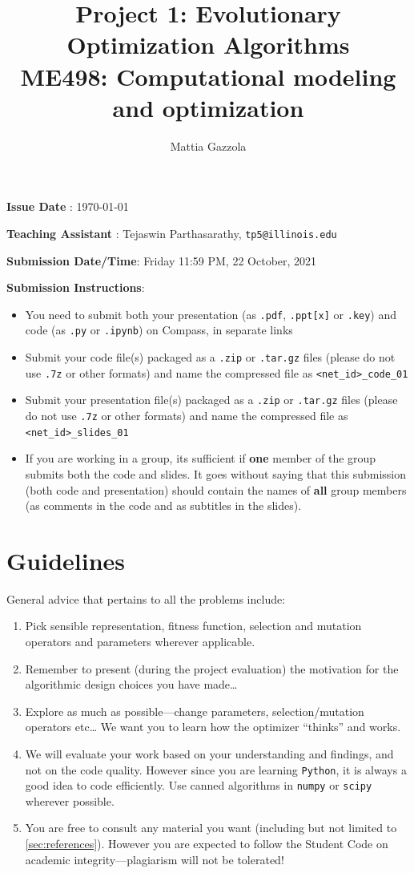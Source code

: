 \documentclass[11pt]{article}
\author{Mattia Gazzola}
\date{}
\title{Project 1: Evolutionary Optimization Algorithms\\\medskip
\large ME498: Computational modeling and optimization}
\begin{document}
\maketitle
{}

\textbf{Issue Date} : \today

\textbf{Teaching Assistant} : Tejaswin Parthasarathy, \texttt{tp5@illinois.edu}

\textbf{Submission Date/Time}: Friday 11:59 PM, 22 October, 2021

\textbf{Submission Instructions}:
\begin{itemize}
\item You need to submit both your presentation (as \texttt{.pdf}, \texttt{.ppt[x]} or \texttt{.key}) and code
(as \texttt{.py} or \texttt{.ipynb}) on Compass, in separate links
\item Submit your code file(s) packaged as a \texttt{.zip} or \texttt{.tar.gz} files (please do not use
\texttt{.7z} or other formats) and name the compressed file as \texttt{<net\_id>\_code\_01}
\item Submit your presentation file(s) packaged as a \texttt{.zip} or \texttt{.tar.gz} files (please do not use
\texttt{.7z} or other formats) and name the compressed file as \texttt{<net\_id>\_slides\_01}
\item If you are working in a group, its sufficient if \textbf{one} member of the group submits both the code
and slides. It goes without saying that this submission (both code and presentation) should
contain the names of \textbf{all} group members (as comments in the code and as subtitles in the
slides).
\end{itemize}

\section{Guidelines}
\label{sec:orgf8caca7}
General advice that pertains to all the problems include:
\begin{enumerate}
\item Pick sensible representation, fitness function, selection and mutation
operators and parameters wherever applicable.
\item Remember to present (during the project evaluation) the motivation for the
algorithmic design choices you have made\ldots{}
\item Explore as much as possible---change parameters, selection/mutation
operators etc\ldots{} We want you to learn how the optimizer ``thinks'' and works.
\item We will evaluate your work based on your understanding and findings, and
not on the code quality. However since you are learning \texttt{Python}, it is
always a good idea to code efficiently. Use canned algorithms in \texttt{numpy} or
\texttt{scipy} wherever possible.
\item You are free to consult any material you want (including but not limited to
\cref{sec:references}). However you are expected to follow the Student Code
on academic integrity---plagiarism will not be tolerated!
\end{enumerate}
\end{document}
